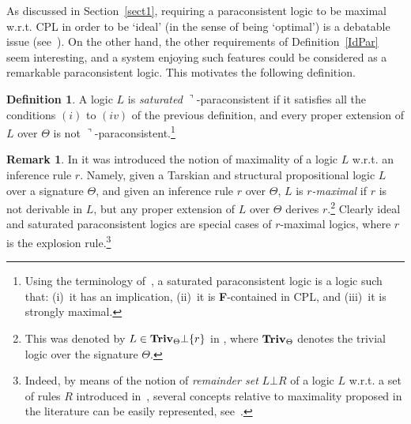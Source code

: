 \documentclass{article}
\theoremstyle{definition}
\newtheorem{definition}{Definition}
\newtheorem{remark}{Remark}
\begin{document}
As discussed in Section~\ref{sect1}, requiring a paraconsistent logic to   be maximal w.r.t. CPL in order to be `ideal' (in the sense of being `optimal') is a debatable  issue (see~\cite{WansOdin}). On the other hand, the other requirements of Definition~\ref{IdPar} seem interesting, and a system enjoying such features could be considered as a remarkable paraconsistent logic. This motivates the following definition.



\begin{definition}
 A logic $L$ is {\em saturated} $\urcorner$-paraconsistent  if it satisfies all the conditions $(i)$ to $(iv)$ of the previous definition, and every proper extension of $L$ over $\Theta$ is not $\urcorner$-paraconsistent.\footnote{Using the terminology of~\cite{AAZbook}, a saturated paraconsistent logic is a logic such that: (i)~it has an implication, (ii)~it is {\bf F}-contained in CPL,  and (iii)~it is strongly maximal.}
\end{definition}

{
\begin{remark}
In \cite[p. 273]{RibCon} it was introduced the notion of maximality of a logic $L$ w.r.t. an inference rule $r$. Namely, given a  Tarskian and structural propositional logic $L$ over a signature $\Theta$, and given an inference rule $r$ over $\Theta$, $L$ is {\em $r$-maximal} if $r$ is not derivable in $L$, but any proper extension of $L$ over $\Theta$ derives $r$.\footnote{This was denoted by $L \in {\bf Triv}_\Theta \bot \{r\}$ in \cite{RibCon}, where ${\bf Triv}_\Theta$ denotes the trivial logic over the signature $\Theta$.} Clearly ideal and saturated paraconsistent logics are special cases of $r$-maximal logics, where $r$ is the explosion rule.\footnote{Indeed, by means of the notion of {\em remainder set} $L \bot R$ of a logic $L$ w.r.t. a set of rules $R$ introduced in~\cite[Definition~7]{RibCon}, several concepts relative to  maximality proposed in the literature can be easily represented, see~\cite[p. 273]{RibCon}.}

\end{remark}}
\end{document}
